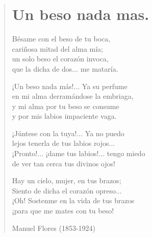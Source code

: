 \documentclass[12pt, twoside]{book}
\begin{document}
\newpage
\begin{verse}
\begin{center}
\section{Un beso nada mas.}
\end{center}
Bésame con el beso de tu boca,\\
cariñosa mitad del alma mía;\\
un solo beso el corazón invoca,\\
que la dicha de dos... me mataría.
\newline

¡Un beso nada más!... Ya su perfume\\
en mi alma derramándose la embriaga,\\
y mi alma por tu beso se consume\\
y por mis labios impaciente vaga.
\newline

¡Júntese con la tuya!... Ya no puedo\\
lejos tenerla de tus labios rojos...\\
¡Pronto!... ¡dame tus labios!... tengo miedo\\
de ver tan cerca tus divinos ojos!
\newline

Hay un cielo, mujer, en tus brazos;\\
Siento de dicha el corazón opreso...\\
¡Oh! Sostenme en la vida de tus brazos\\
¡para que me mates con tu beso!
\newline
 
Manuel Flores (1853-1924)
\end{verse}
\end{document}
